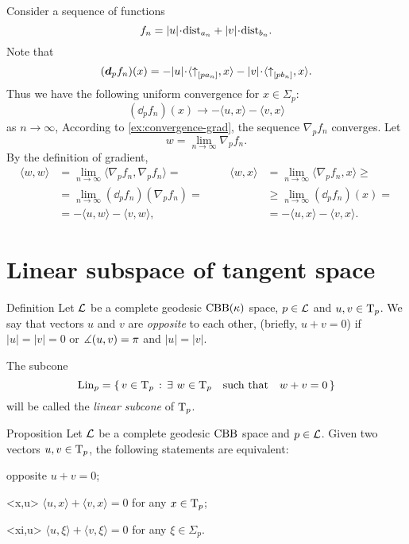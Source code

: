 Consider a sequence of functions 
\[f_n=|u|\cdot\distfun_{a_n}+|v|\cdot\distfun_{b_n}.\]
Note that 
\[(\dd_pf_n)(x)=-|u|\cdot\langle \dir{p}{a_n},x\rangle -|v|\cdot\langle \dir{p}{b_n},x\rangle .\]
Thus we have the following uniform convergence for $x\in\Sigma_p$:
\[(\dd_pf_n)(x)\to-\langle u,x\rangle -\langle v,x\rangle \]
as $n\to\infty$,
According to \ref{ex:convergence-grad}, 
the sequence $\nabla_pf_n$ converges.
Let 
\[w=\lim_{n\to\infty}\nabla_pf_n.\]
By the definition of gradient,
\[\begin{aligned}
\langle w,w\rangle &=\lim_{n\to\infty}\langle \nabla_pf_n,\nabla_pf_n\rangle =
&&&%
\langle w,x\rangle &=\lim_{n\to\infty}\langle \nabla_pf_n,x\rangle \ge
\\%
&=\lim_{n\to\infty}(\dd_p f_n)(\nabla_p f_n)
=
&&&%
&\ge
\lim_{n\to\infty}(\dd_pf_n)(x)
=
\\%
&=-\langle u,w\rangle -\langle v,w\rangle ,
&&&%
&=-\langle u,x\rangle -\langle v,x\rangle .
\end{aligned}\]
\qedsf












\section{Linear subspace of tangent space}

\begin{thm}{Definition}\label{def:opp+Lin}
Let $\mathcal{L}$ be a complete geodesic $\mathrm{CBB}(\kappa)$ space, $p\in \mathcal{L}$ and $u,v\in\mathrm{T}_p$.
We say that vectors $u$ and $v$ are \emph{opposite}\label{def:opposite:page} to each other, (briefly, $u+v=0$) if $|u|=|v|=0$ or $\measuredangle(u,v)=\pi$ and $|u|=|v|$.

The subcone
\[\mathop{\rm Lin}\nolimits_p=\left\{\,{v\in\mathrm{T}_p}\,:\,{\exists\ w\in\mathrm{T}_p\quad \text{such that}\quad w+v=0}\,\right\}\]
will be called the \emph{linear subcone} of $\mathrm{T}_p$.
\end{thm}

\begin{thm}{Proposition}\label{prop:opposite}
Let $\mathcal{L}$ be a complete geodesic $\mathrm{CBB}$ space and $p\in \mathcal{L}$.
Given two vectors $u,v\in\mathrm{T}_p$, the following statements are equivalent:
\begin{subthm}{opposite} $u+v=0$;
\end{subthm}
\begin{subthm}{<x,u>} $\langle u,x\rangle +\langle v,x\rangle =0$ for any $x\in\mathrm{T}_p$;
\end{subthm}
\begin{subthm}{<xi,u>} $\langle u,\xi\rangle +\langle v,\xi\rangle =0$ for any $\xi\in\Sigma_p$.
\end{subthm}
\end{thm}

